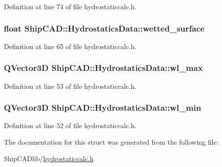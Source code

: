 Definition at line 74 of file hydrostaticcalc.\-h.

\hypertarget{structShipCAD_1_1HydrostaticsData_ad4b78176732ea80000adb94b5b5669f3}{
\subsubsection[{wetted\-\_\-surface}]{\setlength{\rightskip}{0pt plus 5cm}float Ship\-C\-A\-D\-::\-Hydrostatics\-Data\-::wetted\-\_\-surface}}\label{structShipCAD_1_1HydrostaticsData_ad4b78176732ea80000adb94b5b5669f3}


Definition at line 65 of file hydrostaticcalc.\-h.

\hypertarget{structShipCAD_1_1HydrostaticsData_a332be807e8373521c238d82b9dcedc38}{
\subsubsection[{wl\-\_\-max}]{\setlength{\rightskip}{0pt plus 5cm}Q\-Vector3\-D Ship\-C\-A\-D\-::\-Hydrostatics\-Data\-::wl\-\_\-max}}\label{structShipCAD_1_1HydrostaticsData_a332be807e8373521c238d82b9dcedc38}


Definition at line 53 of file hydrostaticcalc.\-h.

\hypertarget{structShipCAD_1_1HydrostaticsData_a3bb2750b6306d9e8ae09bb4eebb1ed0c}{
\subsubsection[{wl\-\_\-min}]{\setlength{\rightskip}{0pt plus 5cm}Q\-Vector3\-D Ship\-C\-A\-D\-::\-Hydrostatics\-Data\-::wl\-\_\-min}}\label{structShipCAD_1_1HydrostaticsData_a3bb2750b6306d9e8ae09bb4eebb1ed0c}


Definition at line 52 of file hydrostaticcalc.\-h.



The documentation for this struct was generated from the following file\-:\begin{DoxyCompactItemize}
\item 
Ship\-C\-A\-Dlib/\hyperlink{hydrostaticcalc_8h}{hydrostaticcalc.\-h}\end{DoxyCompactItemize}
